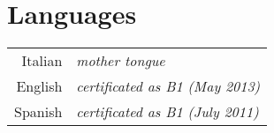 \section*{Languages}
\begin{tabular}{rl}
  Italian & {\small \emph {mother tongue}}\\
  English & {\small \emph {certificated as B1 (May 2013)}}\\
  Spanish & {\small \emph {certificated as B1 (July 2011)}}
\end{tabular}
